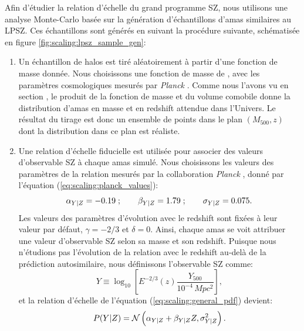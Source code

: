 Afin d'étudier la relation d'échelle du grand programme SZ, nous utilisons une analyse Monte-Carlo basée sur la génération d'échantillons d'amas similaires au LPSZ.
Ces échantillons sont générés en suivant la procédure suivante, schématisée en figure \ref{fig:scaling:lpsz_sample_gen}:
\begin{enumerate}[leftmargin=*]
    \item Un échantillon de halos est tiré aléatoirement à partir d'une fonction de masse donnée.
        Nous choisissons une fonction de masse de , avec les paramètres cosmologiques mesurés par \textit{Planck} \cite{planck_collaboration_planck_2020}.
        Comme nous l'avons vu en section , le produit de la fonction de masse et du volume comobile donne la distribution d'amas en masse et en redshift attendue dans l'Univers.
        Le résultat du tirage est donc un ensemble de points dans le plan $(M_{500}, z)$ dont la distribution dans ce plan est réaliste.
    \item Une relation d'échelle fiducielle est utilisée pour associer des valeurs d'observable SZ à chaque amas simulé.
        Nous choisissons les valeurs des paramètres de la relation mesurés par la collaboration \textit{Planck} \cite{planck_collaboration_planck_2011,planck_collaboration_planck_2014}, donné par l'équation (\ref{eq:scaling:planck_values}):
        \begin{equation}
            \alpha_{Y|Z} = -0.19\;; \qquad \beta_{Y|Z} = 1.79\;; \qquad \sigma_{Y|Z} = 0.075.
        \end{equation}
        Les valeurs des paramètres d'évolution avec le redshift sont fixées à leur valeur par défaut, $\gamma = -2/3$ et $\delta = 0$.
        Ainsi, chaque amas se voit attribuer une valeur d'observable SZ selon sa masse et son redshift.
        Puisque nous n'étudions pas l'évolution de la relation avec le redshift au-delà de la prédiction autosimilaire, nous définissons l'observable SZ comme:
        \begin{equation}
            Y \equiv \log_{10} \left[E^{-2/3}(z) \frac{Y_{500}}{10^{-4} \,\unit{Mpc^2}}\right],
        \end{equation}
        et la relation d'échelle de l'équation (\ref{eq:scaling:general_pdf}) devient:
        \begin{equation}
            \label{eq:scaling:general_pdf_noz}
            P({Y|Z}) = \mathcal{N} \left(\alpha_{Y|Z} + \beta_{Y|Z} Z, \sigma_{Y|Z}^2 \right).
        \end{equation}

\end{enumerate}
